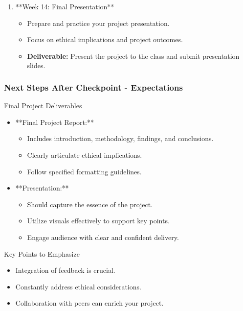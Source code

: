 \documentclass[aspectratio=169]{beamer}
\begin{document}
\begin{frame}[fragile]
\begin{enumerate}
        \item **Week 14: Final Presentation**
            \begin{itemize}
                \item Prepare and practice your project presentation.
                \item Focus on ethical implications and project outcomes.
                \item \textbf{Deliverable:} Present the project to the class and submit presentation slides.
            \end{itemize}
    \end{enumerate}
\end{frame}

\begin{frame}[fragile]
    \frametitle{Next Steps After Checkpoint - Expectations}
    \begin{block}{Final Project Deliverables}
        \begin{itemize}
            \item **Final Project Report:**
                \begin{itemize}
                    \item Includes introduction, methodology, findings, and conclusions.
                    \item Clearly articulate ethical implications.
                    \item Follow specified formatting guidelines.
                \end{itemize}
            \item **Presentation:**
                \begin{itemize}
                    \item Should capture the essence of the project.
                    \item Utilize visuals effectively to support key points.
                    \item Engage audience with clear and confident delivery.
                \end{itemize}
        \end{itemize}
    \end{block}

    \begin{block}{Key Points to Emphasize}
        \begin{itemize}
            \item Integration of feedback is crucial.
            \item Constantly address ethical considerations.
            \item Collaboration with peers can enrich your project.
        \end{itemize}
    \end{block}
\end{frame}
\end{document}
